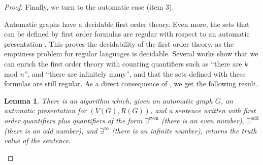 \documentclass[10pt,A4]{amsart}
\newtheorem{lem}[thm]{Lemma}
\theoremstyle{definition}
\theoremstyle{definition}
\begin{document}
\begin{proof}
Finally, we turn to the automatic case (item 3).

Automatic graphs have a decidable first order theory. Even more, the sets that can be defined by first order formulas are regular with respect to an automatic presentation  \cite{khoussainov_automatic_1995}. This proves the decidability of the first order theory, as the emptiness problem for regular languages is decidable. Several works show that we can enrich the first order theory with  counting quantifiers such as  ``there are $k$ mod $n$'', and ``there are infinitely many'', and that the sets defined with these formulas are still regular. As a direct consequence of \cite[Propositions 3.5 and 3.6]{kuske_where_2011}, we get the following result.

\begin{lem} \label{lem:automatic}
    There is an algorithm which, given an automatic graph $G$, an automatic presentation for $(V(G),R(G))$, and a sentence written with first order quantifiers plus quantifiers of the form $\exists^{\text{even}}$ (there is an even number), $\exists^{\text{odd}}$ (there is an odd number), and $\exists^{\infty}$ (there is an infinite number),  returns the truth value of the sentence. 
\end{lem}


\end{proof}
\end{document}
